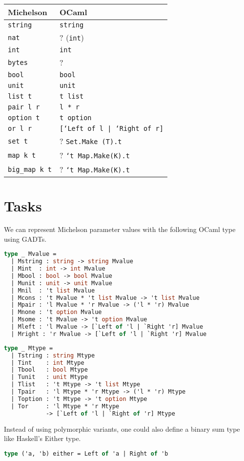\documentclass{article}
\begin{document}
\begin{center}
  \begin{tabular}{|l|l|}
    Michelson & OCaml \\\hline
    \texttt{string}& \texttt{string}  \\
    \texttt{nat} & ? (\texttt{int}) \\
    \texttt{int} & \texttt{int} \\ 
    \texttt{bytes}& ? \\
    \texttt{bool}&\texttt{bool} \\
    \texttt{unit}&\texttt{unit} \\
    \texttt{list t}&\texttt{t list} \\
    \texttt{pair l r}&\texttt{l * r} \\
    \texttt{option t}     &\texttt{t option} \\
    \texttt{or l r}&\texttt{[`Left of l | `Right of r]} \\
    \texttt{set t}&? \texttt{Set.Make (T).t} \\
    \texttt{map k t}&? \texttt{`t Map.Make(K).t} \\
    \texttt{big\_map k t}&? \texttt{`t Map.Make(K).t} \\
    \hline
  \end{tabular}
\end{center}

\section{Tasks}
\label{sec:tasks}

We can represent Michelson parameter values with the following OCaml type using GADTs.
\begin{lstlisting}[language=Caml]
type _ Mvalue =
  | Mstring : string -> string Mvalue
  | Mint  : int -> int Mvalue
  | Mbool : bool -> bool Mvalue
  | Munit : unit -> unit Mvalue
  | Mnil  : 't list Mvalue
  | Mcons : 't Mvalue * 't list Mvalue -> 't list Mvalue
  | Mpair : 'l Mvalue * 'r Mvalue -> ('l * 'r) Mvalue
  | Mnone : 't option Mvalue
  | Msome : 't Mvalue -> 't option Mvalue
  | Mleft : 'l Mvalue -> [`Left of 'l | `Right 'r] Mvalue
  | Mright : 'r Mvalue -> [`Left of 'l | `Right 'r] Mvalue
\end{lstlisting}

\begin{lstlisting}[language=Caml]
type _ Mtype = 
  | Tstring : string Mtype
  | Tint    : int Mtype
  | Tbool   : bool Mtype
  | Tunit   : unit Mtype
  | Tlist   : 't Mtype -> 't list Mtype
  | Tpair   : 'l Mtype * 'r Mtype -> ('l * 'r) Mtype
  | Toption : 't Mtype -> 't option Mtype
  | Tor     : 'l Mtype * 'r Mtype 
            -> [`Left of 'l | `Right of 'r] Mtype
\end{lstlisting}
Instead of using polymorphic variants, one could also define a binary
sum type like Haskell's Either type.
\begin{lstlisting}[language=Caml]
type ('a, 'b) either = Left of 'a | Right of 'b
\end{lstlisting}
\end{document}
